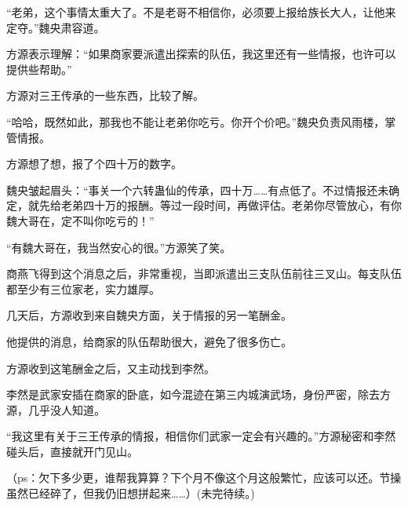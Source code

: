 \begin{this_body}
“老弟，这个事情太重大了。不是老哥不相信你，必须要上报给族长大人，让他来定夺。”魏央肃容道。

方源表示理解：“如果商家要派遣出探索的队伍，我这里还有一些情报，也许可以提供些帮助。”

方源对三王传承的一些东西，比较了解。

“哈哈，既然如此，那我也不能让老弟你吃亏。你开个价吧。”魏央负责风雨楼，掌管情报。

方源想了想，报了个四十万的数字。

魏央皱起眉头：“事关一个六转蛊仙的传承，四十万……有点低了。不过情报还未确定，就先给老弟四十万的报酬。等过一段时间，再做评估。老弟你尽管放心，有你魏大哥在，定不叫你吃亏的！”

“有魏大哥在，我当然安心的很。”方源笑了笑。

商燕飞得到这个消息之后，非常重视，当即派遣出三支队伍前往三叉山。每支队伍都至少有三位家老，实力雄厚。

几天后，方源收到来自魏央方面，关于情报的另一笔酬金。

他提供的消息，给商家的队伍帮助很大，避免了很多伤亡。

方源收到这笔酬金之后，又主动找到李然。

李然是武家安插在商家的卧底，如今混迹在第三内城演武场，身份严密，除去方源，几乎没人知道。

“我这里有关于三王传承的情报，相信你们武家一定会有兴趣的。”方源秘密和李然碰头后，直接就开门见山。

（ps：欠下多少更，谁帮我算算？下个月不像这个月这般繁忙，应该可以还。节操虽然已经碎了，但我仍旧想拼起来……）(未完待续。)

\end{this_body}

